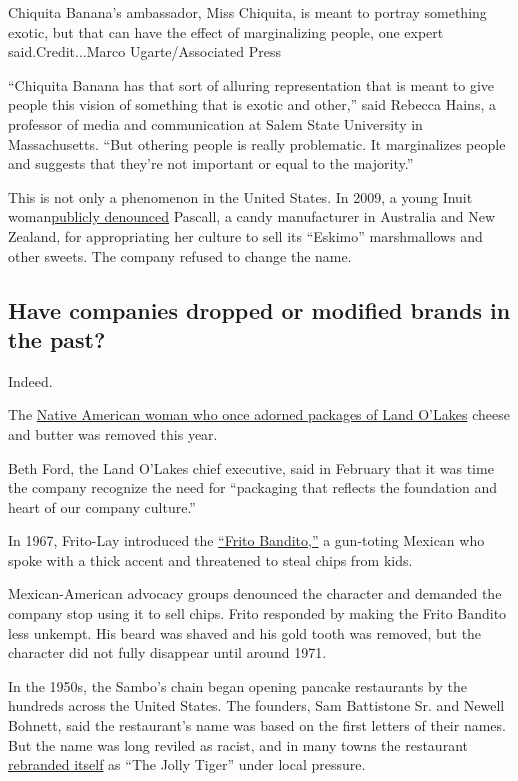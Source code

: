 Chiquita Banana's ambassador, Miss Chiquita, is meant to portray
something exotic, but that can have the effect of marginalizing people,
one expert said.Credit...Marco Ugarte/Associated Press

``Chiquita Banana has that sort of alluring representation that is meant
to give people this vision of something that is exotic and other,'' said
Rebecca Hains, a professor of media and communication at Salem State
University in Massachusetts. ``But othering people is really
problematic. It marginalizes people and suggests that they're not
important or equal to the majority.''

This is not only a phenomenon in the United States. In 2009, a young
Inuit
woman\href{https://www.odt.co.nz/news/national/eskimo-makers-defy-racism-claims}{publicly
denounced} Pascall, a candy manufacturer in Australia and New Zealand,
for appropriating her culture to sell its ``Eskimo'' marshmallows and
other sweets. The company refused to change the name.

\hypertarget{have-companies-dropped-or-modified-brands-in-the-past}{%
\subsection{Have companies dropped or modified brands in the
past?}\label{have-companies-dropped-or-modified-brands-in-the-past}}

Indeed.

The
\href{https://www.nytimes.com/2020/04/17/business/land-o-lakes-butter.html}{Native
American woman who once adorned packages of Land O'Lakes} cheese and
butter was removed this year.

Beth Ford, the Land O'Lakes chief executive, said in February that it
was time the company recognize the need for ``packaging that reflects
the foundation and heart of our company culture.''

In 1967, Frito-Lay introduced the
\href{https://www.youtube.com/watch?v=fOUilxJWm24}{``Frito Bandito,''} a
gun-toting Mexican who spoke with a thick accent and threatened to steal
chips from kids.

Mexican-American advocacy groups denounced the character and demanded
the company stop using it to sell chips. Frito responded by making the
Frito Bandito less unkempt. His beard was shaved and his gold tooth was
removed, but the character did not fully disappear until around 1971.

In the 1950s, the Sambo's chain began opening pancake restaurants by the
hundreds across the United States. The founders, Sam Battistone Sr. and
Newell Bohnett, said the restaurant's name was based on the first
letters of their names. But the name was long reviled as racist, and in
many towns the restaurant
\href{https://www.nytimes.com/1978/11/18/archives/sambos-under-fire-over-name-sambos-is-under-attack-over-name.html}{rebranded
itself} as ``The Jolly Tiger'' under local pressure.

